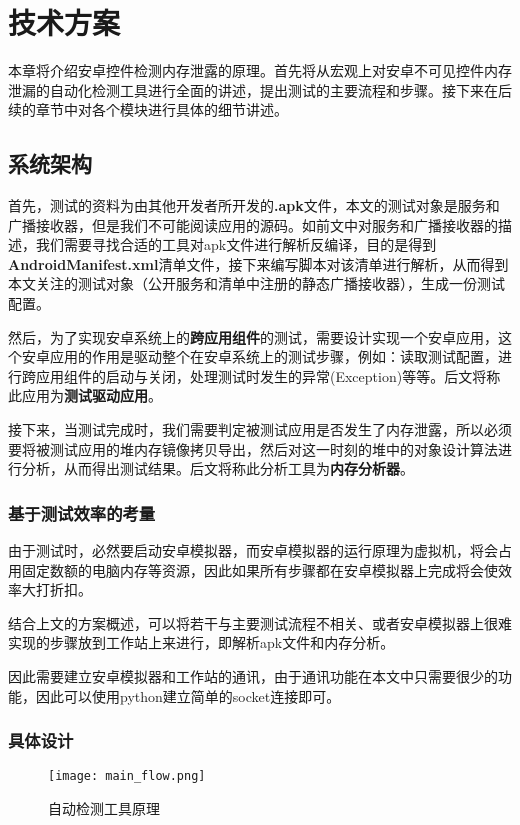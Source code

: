
\chapter{技术方案}\label{chapter_system}
本章将介绍安卓控件检测内存泄露的原理。首先将从宏观上对安卓不可见控件内存泄漏的自动化检测工具进行全面的讲述，提出测试的主要流程和步骤。接下来在后续的章节中对各个模块进行具体的细节讲述。

\section{系统架构}


首先，测试的资料为由其他开发者所开发的\textbf{.apk}文件，本文的测试对象是服务和广播接收器，但是我们不可能阅读应用的源码。如前文中对服务和广播接收器的描述，我们需要寻找合适的工具对apk文件进行解析反编译，目的是得到\textbf{AndroidManifest.xml}清单文件，接下来编写脚本对该清单进行解析，从而得到本文关注的测试对象（公开服务和清单中注册的静态广播接收器），生成一份测试配置。

然后，为了实现安卓系统上的\textbf{跨应用组件}的测试，需要设计实现一个安卓应用，这个安卓应用的作用是驱动整个在安卓系统上的测试步骤，例如：读取测试配置，进行跨应用组件的启动与关闭，处理测试时发生的异常(Exception)等等。后文将称此应用为\textbf{测试驱动应用}。

接下来，当测试完成时，我们需要判定被测试应用是否发生了内存泄露，所以必须要将被测试应用的堆内存镜像拷贝导出，然后对这一时刻的堆中的对象设计算法进行分析，从而得出测试结果。后文将称此分析工具为\textbf{内存分析器}。

\subsection{基于测试效率的考量}

由于测试时，必然要启动安卓模拟器，而安卓模拟器的运行原理为虚拟机，将会占用固定数额的电脑内存等资源，因此如果所有步骤都在安卓模拟器上完成将会使效率大打折扣。

结合上文的方案概述，可以将若干与主要测试流程不相关、或者安卓模拟器上很难实现的步骤放到工作站上来进行，即解析apk文件和内存分析。

因此需要建立安卓模拟器和工作站的通讯，由于通讯功能在本文中只需要很少的功能，因此可以使用python建立简单的socket连接即可。

\subsection{具体设计}
\begin{figure}[htbp]
	\centering
	\texttt{[image: main\_flow.png]} %
	\caption{自动检测工具原理}
	\label{fig:flow}
\end{figure}

